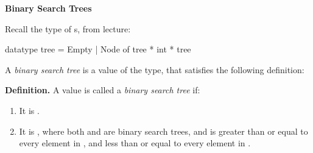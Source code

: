\documentclass[addpoints,12pt]{exam}
\begin{document}
\begin{questions}

\newpage
{}

\textbf{Binary Search Trees}

Recall the type of s, from lecture:
\begin{codeblock}
  datatype tree = Empty | Node of tree * int * tree
\end{codeblock}

A \textit{binary search tree} is a value of the  type, that satisfies the
following definition: 

\textbf{Definition.} A value  is called a \textit{binary search tree} if:
\begin{enumerate}
  \item It is .
  \item It is , where both  and  are binary search trees,
  and  is greater than or equal to every element in , and less than or
  equal to every element in .
\end{enumerate}


\end{questions}
\end{document}
